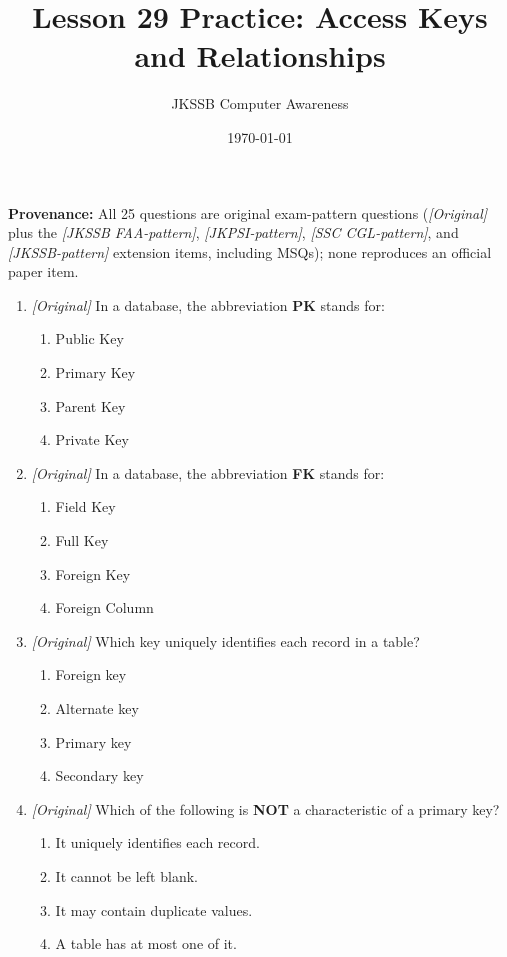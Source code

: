 \documentclass[11pt]{article}
\title{Lesson 29 Practice: Access Keys and Relationships}
\author{JKSSB Computer Awareness}
\date{\today}
\begin{document}
\maketitle
\noindent\textbf{Provenance:} All 25 questions are original exam-pattern questions (\textit{[Original]} plus the \textit{[JKSSB FAA-pattern]}, \textit{[JKPSI-pattern]}, \textit{[SSC CGL-pattern]}, and \textit{[JKSSB-pattern]} extension items, including MSQs); none reproduces an official paper item.

\begin{enumerate}[label=\textbf{Q\arabic*.}, leftmargin=*]
\item \textit{[Original]} In a database, the abbreviation \textbf{PK} stands
  for:
  \begin{enumerate}[label=\Alph*.]
    \item Public Key
    \item Primary Key
    \item Parent Key
    \item Private Key
  \end{enumerate}
\item \textit{[Original]} In a database, the abbreviation \textbf{FK} stands
  for:
  \begin{enumerate}[label=\Alph*.]
    \item Field Key
    \item Full Key
    \item Foreign Key
    \item Foreign Column
  \end{enumerate}
\item \textit{[Original]} Which key uniquely identifies each record in a
  table?
  \begin{enumerate}[label=\Alph*.]
    \item Foreign key
    \item Alternate key
    \item Primary key
    \item Secondary key
  \end{enumerate}
\item \textit{[Original]} Which of the following is \textbf{NOT} a
  characteristic of a primary key?
  \begin{enumerate}[label=\Alph*.]
    \item It uniquely identifies each record.
    \item It cannot be left blank.
    \item It may contain duplicate values.
    \item A table has at most one of it.

\end{enumerate}
\end{enumerate}
\end{document}
